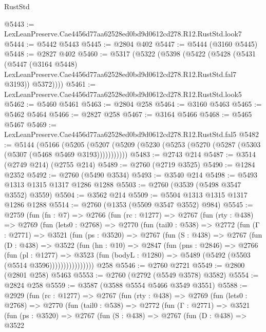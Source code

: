 \begin{lexlean}{RustStd}
\begin{coremodule}
@5443 := LexLeanPreserve.Cae4456d77aa62528ed0bd9d0612cd278.R12.RustStd.look7
@5444 := @5442 @5443
@5445 := @2804 @402
@5447 := @5444 (@3160 @5445)
@5448 := @2827 @402
@5460 := @5317
    (@5322
      (@5398
        (@5422
          (@5428
            (@5431
              (@5447
                (@3164 @5448)
                LexLeanPreserve.Cae4456d77aa62528ed0bd9d0612cd278.R12.RustStd.fal7
                @3193))
            @5372))))
@5461 := LexLeanPreserve.Cae4456d77aa62528ed0bd9d0612cd278.R12.RustStd.look5
@5462 := @5460 @5461
@5463 := @2804 @258
@5464 := @3160 @5463
@5465 := @5462 @5464
@5466 := @2827 @258
@5467 := @3164 @5466
@5468 := @5465 @5467
@5469 := LexLeanPreserve.Cae4456d77aa62528ed0bd9d0612cd278.R12.RustStd.fal5
@5482 := @5144
    (@5166
      (@5205 (@5207 (@5209 (@5230 (@5253 (@5270 (@5287 (@5303 (@5307 (@5468 @5469 @3193)))))))))))
@5483 := @2743 @214
@5487 := @3514 (@2749 @214) (@2755 @214)
@5489 := @2760 (@2719 @3525)
@5490 := @1284 @2352
@5492 := @2760 (@5490 @3534)
@5493 := @3540 @214
@5498 := @5493 @1313 @1315 @1317 @1286 @1288
@5503 := @2760 (@3539 (@5498 @3547 @3552) @3559)
@5504 := @3562 @214
@5509 := @5504 @1313 @1315 @1317 @1286 @1288
@5514 := @2760 (@1353 (@5509 @3547 @3552) @984)
@5545 := @2759
    (fun (fn : @7) =>
    @2766
      (fun (rc : @1277) =>
      @2767
        (fun (rty : @438) =>
        @2769
          (fun (lets0 : @2768) =>
          @2770
            (fun (tail0 : @538) =>
            @2772
              (fun (Γ : @2771) =>
              @3521
                (fun (ps : @3520) =>
                @2767
                  (fun (S : @438) =>
                  @2767
                    (fun (D : @438) =>
                    @3522
                      (fun (hn : @10) =>
                      @2847
                        (fun (pns : @2846) =>
                        @2766
                          (fun (pl : @1277) =>
                          @3523
                            (fun (bodyL : @1280) => @5489 (@5492 (@5503 (@5514 @3596))))))))))))))))
    @258
@5546 := @2760 @2721
@5549 := @2800 (@2801 @258) @5463
@5553 := @2760 (@2792 (@5549 @3578) @3582)
@5554 := @2824 @258
@5559 := @3587 (@3588 @5554 @5466 @3549 @3551)
@5588 := @2929
    (fun (rc : @1277) =>
    @2767
      (fun (rty : @438) =>
      @2769
        (fun (lets0 : @2768) =>
        @2770
          (fun (tail0 : @538) =>
          @2772
            (fun (Γ : @2771) =>
            @3521
              (fun (ps : @3520) =>
              @2767
                (fun (S : @438) =>
                @2767
                  (fun (D : @438) =>
                  @3522

\end{coremodule}
\end{lexlean}
